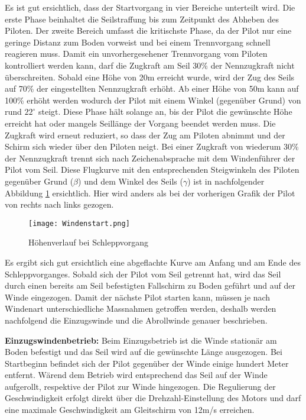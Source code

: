 Es ist gut ersichtlich, dass der Startvorgang in vier Bereiche unterteilt wird. Die erste Phase beinhaltet die Seilstraffung bis zum Zeitpunkt des Abheben des Piloten. Der zweite Bereich umfasst die kritischste Phase, da der Pilot nur eine geringe Distanz zum Boden vorweist und bei einem Trennvorgang schnell reagieren muss. Damit ein unvorhergesehener Trennvorgang vom Piloten kontrolliert werden kann, darf die Zugkraft am Seil 30\% der Nennzugkraft nicht überschreiten. Sobald eine Höhe von 20m erreicht wurde, wird der Zug des Seils auf 70\% der eingestellten Nennzugkraft erhöht. Ab einer Höhe von 50m kann auf 100\% erhöht werden wodurch der Pilot mit einem Winkel (gegenüber Grund) von rund $22^\circ$ steigt. Diese Phase hält solange an, bis der Pilot die gewünschte Höhe erreicht hat oder mangels Seillänge der Vorgang beendet werden muss. Die Zugkraft wird erneut reduziert, so dass der Zug am Piloten abnimmt und der Schirm sich wieder über den Piloten neigt. Bei einer Zugkraft von wiederum 30\% der Nennzugkraft trennt sich nach Zeichenabsprache mit dem Windenführer der Pilot vom Seil. Diese Flugkurve mit den entsprechenden Steigwinkeln des Piloten gegenüber Grund ($\beta$) und dem Winkel des Seils ($\gamma$) ist in nachfolgender Abbildung \ref{fig:HoehenverlaufSchlepp} ersichtlich. Hier wird anders als bei der vorherigen Grafik der Pilot von rechts nach links gezogen.


\begin{figure}[H]
	\begin{center}
		\texttt{[image: Windenstart.png]}
		\caption{Höhenverlauf bei Schleppvorgang \cite{PhysikWindenschlepp}}
		\label{fig:HoehenverlaufSchlepp}
	\end{center}
\end{figure}

Es ergibt sich gut ersichtlich eine abgeflachte Kurve am Anfang und am Ende des Schleppvorganges. Sobald sich der Pilot vom Seil getrennt hat, wird das Seil durch einen bereits am Seil befestigten Fallschirm zu Boden geführt und auf der Winde eingezogen. Damit der nächste Pilot starten kann, müssen je nach Windenart unterschiedliche Massnahmen getroffen werden, deshalb werden nachfolgend die Einzugswinde und die Abrollwinde genauer beschrieben.


\textbf{Einzugswindenbetrieb:}
Beim Einzugsbetrieb ist die Winde stationär am Boden befestigt und das Seil wird auf die gewünschte Länge ausgezogen. Bei Startbeginn befindet sich der Pilot gegenüber der Winde einige hundert Meter entfernt. Wärend dem Betrieb wird entsprechend das Seil auf der Winde aufgerollt, respektive der Pilot zur Winde hingezogen. Die Regulierung der Geschwindigkeit erfolgt direkt über die Drehzahl-Einstellung des Motors und darf eine maximale Geschwindigkeit am Gleitschirm von 12m/s erreichen.

